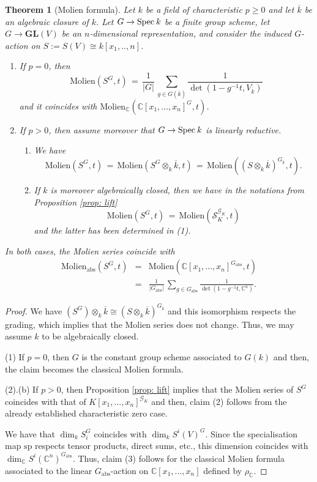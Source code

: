 \documentclass[reqno]{amsart}
\newcommand{\CC}{{\mathbb{C}}}
\newcommand{\Spec}{{\rm Spec}\:}
\newcommand{\GL}{{\mathbf{GL}}}
\theoremstyle{definition}
\theoremstyle{plain}
\newtheorem{Theorem}[Definition]{Theorem}
\begin{document}
\begin{Theorem}[Molien formula]
\label{thm: molien}
Let $k$ be a field of characteristic $p\geq0$ and let
$\overline{k}$ be an algebraic closure of $k$.
Let $G\to\Spec k$ be a finite group scheme, let
$G\to\GL(V)$ be an $n$-dimensional representation, and consider the
induced $G$-action on $S:=S(V)\cong k[x_1,..,n]$.
 \begin{enumerate}
 \item  If $p=0$, then 
 $$
  \mathrm{Molien}(S^G,t) \,=\, 
  \frac{1}{|G|}\,
  \sum_{g\in G(\overline{k})} \frac{1}{\det(1-g^{-1}t,V_{\overline{k}})} 
 $$
 and it coincides with $\mathrm{Molien}_\CC(\CC[x_1,...,x_n]^G,t)$.
 \item
 If $p>0$, then assume moreover that $G\to\Spec k$ is linearly reductive.
 \begin{enumerate}
 \item We have
 $$
 \mathrm{Molien} (S^G,t) \,=\, 
 \mathrm{Molien}( S^G\otimes_k\overline{k},t) \,=\,
 \mathrm{Molien}( (S\otimes_k\overline{k})^{G_{\overline{k}}},t).
 $$
 \item 
 If $k$ is moreover algebraically closed, then we have in
  the notations from Proposition \ref{prop: lift} 
 $$
 \mathrm{Molien}(S^G,t) \,=\, \mathrm{Molien}(\mathcal{S}_K^{\mathcal{G}_K},t)
 $$
 and the latter has been determined in (1).
 \end{enumerate}
 \end{enumerate}
In both cases, the Molien series coincide with
 \begin{eqnarray*}
  \mathrm{Molien}_{\mathrm{abs}}(S^G,t) &=&
  \mathrm{Molien} (\CC[x_1,...,x_n]^{G_{\mathrm{abs}}},t) \\
  &=& \frac{1}{|G_{\mathrm{abs}}|}\,
  \sum_{g\in G_{\mathrm{abs}}} \frac{1}{\det(1-g^{-1}t,\CC^n)}.
 \end{eqnarray*}
\end{Theorem}

\begin{proof}
We have $(S^G)\otimes_k\overline{k}\cong (S\otimes_k\overline{k})^{G_{\overline{k}}}$
and this isomorphism respects the grading, which implies that the Molien series
does not change.
Thus, we may assume $k$ to be algebraically closed.

(1) If $p=0$, then $G$ is the constant group scheme associated to $G(k)$
and then, the claim becomes the classical Molien formula.

(2).(b) If $p>0$, then Proposition \ref{prop: lift} implies that the Molien series
of $S^G$ coincides with that of $K[x_1,...,x_n]^{\mathcal{G}_K}$
and then, claim (2) follows from the already established
characteristic zero case.

We have that $\dim_kS_i^G$ coincides with $\dim_k S^i(V)^G$.
Since the specialisation map $\mathrm{sp}$ respects tensor products, direct sums, etc., 
this dimension coincides with $\dim_\CC S^i(\CC^n)^{G_{\mathrm{abs}}}$.
Thus, claim (3) follows for the classical Molien formula associated to the linear
$G_{\mathrm{abs}}$-action on $\CC[x_1,...,x_n]$ defined by $\rho_\CC$.
\end{proof}
\end{document}
